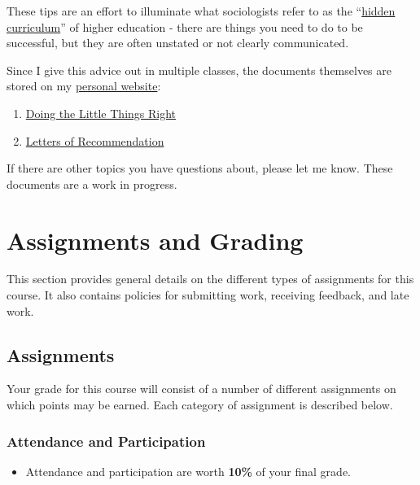 \documentclass[]{book}
\providecommand{\tightlist}{%
  \setlength{\itemsep}{0pt}\setlength{\parskip}{0pt}}
\newenvironment{rmdblock}[1]
  {\begin{shaded*}
  \begin{itemize}
  \renewcommand{\labelitemi}{
    \raisebox{-.7\height}[0pt][0pt]{
      {\setkeys{Gin}{width=3em,keepaspectratio}\texttt{[image: images/\#1]}}
    }
  }
  \item
  }
  {
  \end{itemize}
  \end{shaded*}
  }
\newenvironment{rmdtip}
  {\begin{rmdblock}{tip}}
  {\end{rmdblock}}
\begin{document}
These tips are an effort to illuminate what sociologists refer to as the ``\href{https://books.google.com/books?hl=en\&lr=\&id=5r-TAgAAQBAJ\&oi=fnd\&pg=PP1\&dq=hidden+curriculum\#v=onepage\&q=hidden\%20curriculum\&f=false}{hidden curriculum}'' of higher education - there are things you need to do to be successful, but they are often unstated or not clearly communicated.

Since I give this advice out in multiple classes, the documents themselves are stored on my \href{https://chris-prener.github.io}{personal website}:

\begin{enumerate}
\def\labelenumi{\arabic{enumi}.}
\tightlist
\item
  \href{https://chris-prener.github.io/resources/students/little-things/}{Doing the Little Things Right}
\item
  \href{https://chris-prener.github.io/resources/students/letters/}{Letters of Recommendation}
\end{enumerate}

If there are other topics you have questions about, please let me know. These documents are a work in progress.

\hypertarget{assignments-and-grading}{%
\chapter{Assignments and Grading}\label{assignments-and-grading}}

This section provides general details on the different types of assignments for this course. It also contains policies for submitting work, receiving feedback, and late work.

\hypertarget{assignments}{%
\section{Assignments}\label{assignments}}

Your grade for this course will consist of a number of different assignments on which points may be earned. Each category of assignment is described below.

\hypertarget{attendance-and-participation-1}{%
\subsection{Attendance and Participation}\label{attendance-and-participation-1}}

\begin{rmdtip}
Attendance and participation are worth \textbf{10\%} of your final
grade.
\end{rmdtip}
\end{document}
